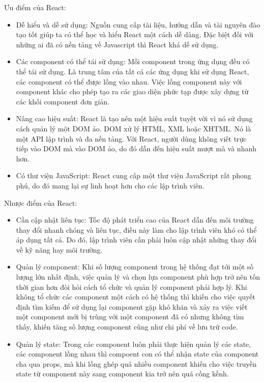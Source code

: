             Ưu điểm của React:
            \begin{itemize}
                \item Dễ hiểu và dễ sử dụng: Nguồn cung cấp tài liệu, hướng dẫn và tài nguyên đào tạo tốt giúp ta có thể học và hiểu React một cách dễ dàng. Đặc biệt đối với những ai đã có nền tảng về Javascript thì React khá dễ sử dụng.
                \item Các component có thể tái sử dụng: Mỗi component trong ứng dụng đều có thể tái sử dụng. Là trung tâm của tất cả các ứng dụng khi sử dụng React, các component có thể được lồng vào nhau. Việc lồng component này với component khác cho phép tạo ra các giao diện phức tạp được xây dựng từ các khối component đơn giản.
                \item Nâng cao hiệu suất: React là tạo nên một hiệu suất tuyệt vời vì nó sử dụng cách quản lý một DOM ảo. DOM xử lý HTML, XML hoặc XHTML. Nó là một API lập trình và đa nền tảng. Với React, người dùng không viết trực tiếp vào DOM mà vào DOM ảo, do đó dẫn đến hiệu suất mượt mà và nhanh hơn.
                \item Có thư viện JavaScript: React cung cấp một thư viện JavaScript rất phong phú, do đó mang lại sự linh hoạt hơn cho các lập trình viên.
            \end{itemize}

            Nhược điểm của React:
            \begin{itemize}
                \item Cần cập nhật liên tục: Tốc độ phát triển cao của React dẫn đến môi trường thay đổi nhanh chóng và liên tục, điều này làm cho lập trình viên khó có thể áp dụng tất cả. Do đó, lập trình viên cần phải luôn cập nhật những thay đổi về kỹ năng hay môi trường.
                \item Quản lý component: Khi số lượng component trong hệ thống đạt tới một số lượng lớn nhất định, việc quản lý và chọn lựa component phù hợp trở nên tốn thời gian hơn đòi hỏi cách tổ chức và quản lý component phải hợp lý. Khi không tổ chức các component một cách có hệ thống thì khiến cho việc quyết định tìm kiếm để sử dụng lại component gặp khó khăn và xảy ra việc viết một component mới bị trùng với một component đã có nhưng không tìm thấy, khiến tăng số lượng component cũng như chi phí về lưu trữ code.
                \item Quản lý state: Trong các component luôn phải thực hiện quản lý các state, các component lồng nhau thì compoent con có thể nhận state của component cha qua props, mà khi lồng ghép quá nhiều component khiến cho việc truyền state từ component này sang component kia trở nên quá cồng kềnh.
            \end{itemize}
